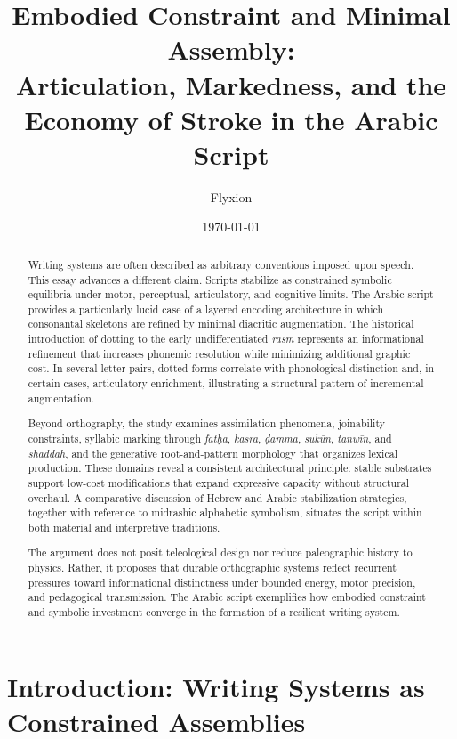 \documentclass[11pt]{article}
\title{
Embodied Constraint and Minimal Assembly:\\[0.5em]
\large Articulation, Markedness, and the Economy of Stroke in the Arabic Script
}
\author{Flyxion}
\date{\today}
\begin{document}
\maketitle

\begin{abstract}

Writing systems are often described as arbitrary conventions imposed upon speech. This essay advances a different claim. Scripts stabilize as constrained symbolic equilibria under motor, perceptual, articulatory, and cognitive limits. The Arabic script provides a particularly lucid case of a layered encoding architecture in which consonantal skeletons are refined by minimal diacritic augmentation. The historical introduction of dotting to the early undifferentiated \textit{rasm} represents an informational refinement that increases phonemic resolution while minimizing additional graphic cost. In several letter pairs, dotted forms correlate with phonological distinction and, in certain cases, articulatory enrichment, illustrating a structural pattern of incremental augmentation.

Beyond orthography, the study examines assimilation phenomena, joinability constraints, syllabic marking through \textit{fatḥa}, \textit{kasra}, \textit{ḍamma}, \textit{sukūn}, \textit{tanwīn}, and \textit{shaddah}, and the generative root-and-pattern morphology that organizes lexical production. These domains reveal a consistent architectural principle: stable substrates support low-cost modifications that expand expressive capacity without structural overhaul. A comparative discussion of Hebrew and Arabic stabilization strategies, together with reference to midrashic alphabetic symbolism, situates the script within both material and interpretive traditions.

The argument does not posit teleological design nor reduce paleographic history to physics. Rather, it proposes that durable orthographic systems reflect recurrent pressures toward informational distinctness under bounded energy, motor precision, and pedagogical transmission. The Arabic script exemplifies how embodied constraint and symbolic investment converge in the formation of a resilient writing system.

\end{abstract}

\newpage
\section{Introduction: Writing Systems as Constrained Assemblies}
\end{document}
